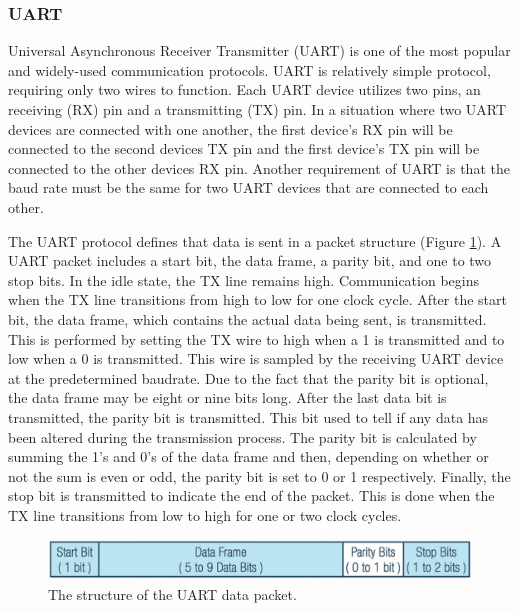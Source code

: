 \subsubsection{UART}
Universal Asynchronous Receiver Transmitter (UART) is one of the most popular and widely-used communication protocols. UART is relatively simple protocol, requiring only two wires to function. Each UART device utilizes two pins, an receiving (RX) pin and a transmitting (TX) pin. In a situation where two UART devices are connected with one another, the first device's RX pin will be connected to the second devices TX pin and the first device's TX pin will be connected to the other devices RX pin. Another requirement of UART is that the baud rate must be the same for two UART devices that are connected to each other.

The UART protocol defines that data is sent in a packet structure (Figure \ref{fig:uart-data-packet}). A UART packet includes a start bit, the data frame, a parity bit, and one to two stop bits. In the idle state, the TX line remains high. Communication begins when the TX line transitions from high to low for one clock cycle. After the start bit, the data frame, which contains the actual data being sent, is transmitted. This is performed by setting the TX wire to high when a 1 is transmitted and to low when a 0 is transmitted. This wire is sampled by the receiving UART device at the predetermined baudrate. Due to the fact that the parity bit is optional, the data frame may be eight or nine bits long. After the last data bit is transmitted, the parity bit is transmitted. This bit used to tell if any data has been altered during the transmission process. The parity bit is calculated by summing the 1's and 0's of the data frame and then, depending on whether or not the sum is even or odd, the parity bit is set to 0 or 1 respectively. Finally, the stop bit is transmitted to indicate the end of the packet. This is done when the TX line transitions from low to high for one or two clock cycles.

\begin{figure}
    \centering
    \includegraphics[width=6in]{figures/uart-data-packet.png}
    \caption{The structure of the UART data packet.}
    \label{fig:uart-data-packet}
\end{figure}

